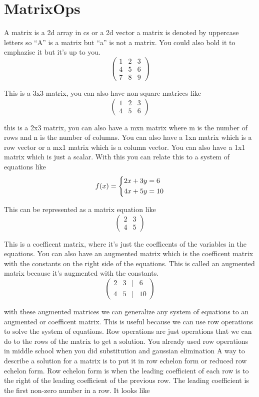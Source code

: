 \documentclass{article}
\begin{document}
\section{MatrixOps}
\par{A matrix is a 2d array in cs or a 2d vector a matrix is denoted by uppercase letters so ``A'' is a matrix but ``a'' is not a matrix. You could also bold it to emphazise it but it's up to you.}
$$\begin{pmatrix}
1 & 2 & 3 \\
4 & 5 & 6 \\
7 & 8 & 9
\end{pmatrix}$$
\par{This is a 3x3 matrix, you can also have non-square matrices like}
$$\begin{pmatrix}
1 & 2 & 3 \\
4 & 5 & 6
\end{pmatrix}$$
\par{this is a 2x3 matrix, you can also have a mxn matrix where m is the number of rows and n is the number of columns. 
You can also have a 1xn matrix which is a row vector or a mx1 matrix which is a column vector.
You can also have a 1x1 matrix which is just a scalar.
With this you can relate this to a system of equations like}
$$f(x) = \begin{dcases}
2x + 3y = 6 \\
4x + 5y = 10
\end{dcases}$$
\par{This can be represented as a matrix equation like}
$$\begin{pmatrix}
2 & 3 \\
4 & 5
\end{pmatrix}$$
\par{This is a coefficent matrix, where it's just the coefficents of the variables in the equations. You can also have an augmented matrix which is the coefficent matrix with the constants on the right side of the equations.
This is called an augmented matrix because it's augmented with the constants.}
$$\begin{pmatrix}
2 & 3 & | & 6 \\
4 & 5 & | & 10
\end{pmatrix}$$
\par{with these augmented matrices we can generalize any system of equations to an augmented or coefficent matrix.
This is useful because we can use row operations to solve the system of equations. Row operations are just operations that we can do to the rows of the matrix to get a solution.
You already used row operations in middle school when you did substitution and gaussian elimination A way to describe a solution for a matrix 
is to put it in row echelon form or reduced row echelon form. Row echelon form is when the leading coefficient of each row is to the right of the leading coefficient of the previous row.
The leading coefficient is the first non-zero number in a row. It looks like}
\end{document}
